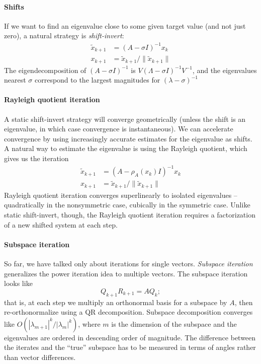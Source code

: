 \documentclass[12pt, leqno]{article}
\begin{document}
\paragraph{Shifts}
If we want to find an eigenvalue close to some given target value
(and not just zero), a natural strategy is {\em shift-invert}:
\begin{align*}
  \tilde{x}_{k+1} &= (A-\sigma I)^{-1} x_k \\
  x_{k+1} &= \tilde{x}_{k+1}/\|\tilde{x}_{k+1}\|
\end{align*}
The eigendecomposition of $(A-\sigma I)^{-1}$ is
$V (\Lambda - \sigma I)^{-1} V^{-1}$, and the eigenvalues
nearest $\sigma$ correspond to the
largest magnitudes for $(\lambda-\sigma)^{-1}$

\paragraph{Rayleigh quotient iteration}
A static shift-invert strategy will converge geometrically (unless the
shift is an eigenvalue, in which case convergence is instantaneous).
We can accelerate convergence by using increasingly accurate estimates
for the eigenvalue as shifts.  A natural way to estimate the
eigenvalue is using the Rayleigh quotient, which gives us the iteration
\begin{align*}
  \tilde{x}_{k+1} &= (A-\rho_A(x_k) I)^{-1} x_k \\
  x_{k+1} &= \tilde{x}_{k+1}/\|\tilde{x}_{k+1}\|
\end{align*}
Rayleigh quotient iteration converges superlinearly to isolated
eigenvalues -- quadratically in the nonsymmetric case, cubically in
the symmetric case.  Unlike static shift-invert, though, the Rayleigh
quotient iteration requires a factorization of a new shifted system
at each step.

\paragraph{Subspace iteration}
So far, we have talked only about iterations for single vectors.
{\em Subspace iteration} generalizes the power iteration idea to
multiple vectors.  The subspace iteration looks like
\[
  Q_{k+1} R_{k+1} = A Q_{k};
\]
that is, at each step we multiply an orthonormal basis for a subspace
by $A$, then re-orthonormalize using a QR decomposition.  Subspace
decomposition converges like $O(|\lambda_{m+1}|^k/|\lambda_{m}|^k)$,
where $m$ is the dimension of the subspace and the eigenvalues are
ordered in descending order of magnitude.  The difference between the
iterates and the ``true'' subspace has to be measured in terms of
angles rather than vector differences.
\end{document}

